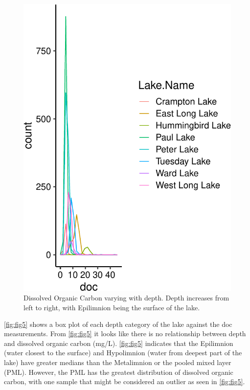 \documentclass[12pt,]{article}
\begin{document}
\begin{figure}
\centering
\includegraphics{Watson_ENV872_Project_files/figure-latex/unnamed-chunk-9-1.pdf}
\caption{\label{fig:fig5} Dissolved Organic Carbon varying with depth.
Depth increases from left to right, with Epilimnion being the surface of
the lake.}
\end{figure}

\autoref{fig:fig5} shows a box plot of each depth category of the lake
against the doc measurements. From \autoref{fig:fig5} it looks like
there is no relationship between depth and dissolved organic carbon
(mg/L). \autoref{fig:fig5} indicates that the Epilimnion (water closest
to the surface) and Hypolimnion (water from deepest part of the lake)
have greater medians than the Metalimnion or the pooled mixed layer
(PML). However, the PML has the greatest distribution of dissolved
organic carbon, with one sample that might be considered an outlier as
seen in \autoref{fig:fig5}.
\end{document}
